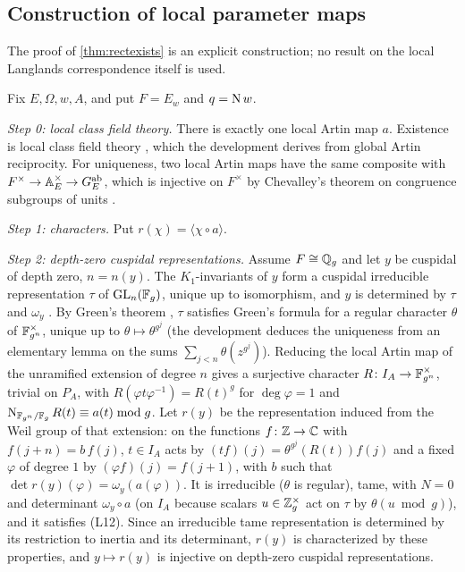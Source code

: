 \subsection{Construction of local parameter maps}\label{sec:galois:llcproof}

The proof of \cref{thm:rectexists} is an explicit construction; no result on the local Langlands
correspondence itself is used.

\begin{proofoutline}
Fix $E,\Omega,w,A$, and put $F=E_w$ and $q=\operatorname{N} w$.

\emph{Step 0: local class field theory.} There is exactly one local Artin map $a$. Existence is local
class field theory \cite{Serre1967,ArtinTate1968,Tate1979}, which the development derives from global
Artin reciprocity. For uniqueness, two local Artin maps have the same composite with
$F^\times\to\mathbb{A}_E^\times\to G_E^{\mathrm{ab}}$, which is injective on $F^\times$ by Chevalley's theorem on
congruence subgroups of units \cite{Chevalley1951}.

\emph{Step 1: characters.} Put $r(\chi)=\langle\chi\circ a\rangle$.

\emph{Step 2: depth-zero cuspidal representations.} Assume $F\cong\mathbb{Q}_g$ and let $y$ be cuspidal of
depth zero, $n=n(y)$. The $K_1$-invariants of $y$ form a cuspidal irreducible representation $\tau$ of
$\operatorname{GL}_n(\mathbb{F}_g)$, unique up to isomorphism, and $y$ is determined by $\tau$ and $\omega_y$
\cite{MoyPrasad1996,BushnellKutzko1993}. By Green's theorem \cite{Green1955}, $\tau$ satisfies Green's
formula for a regular character $\theta$ of $\mathbb{F}_{g^n}^\times$, unique up to $\theta\mapsto\theta^{g^j}$
(the development deduces the uniqueness from an elementary lemma on the sums
$\sum_{j<n}\theta(z^{g^j})$). Reducing the local Artin map of the unramified extension of degree $n$
gives a surjective character $R\colon I_A\to\mathbb{F}_{g^n}^\times$, trivial on $P_A$, with
$R(\varphi t\varphi^{-1})=R(t)^g$ for $\deg\varphi=1$ and $\operatorname{N}_{\mathbb{F}_{g^n}/\mathbb{F}_g}R(t)\equiv a(t)\bmod g$. Let
$r(y)$ be the representation induced from the Weil group of that extension: on the functions
$f\colon\mathbb{Z}\to\mathbb{C}$ with $f(j+n)=b\,f(j)$, $t\in I_A$ acts by $(tf)(j)=\theta^{g^j}(R(t))f(j)$ and a fixed
$\varphi$ of degree $1$ by $(\varphi f)(j)=f(j+1)$, with $b$ such that $\det r(y)(\varphi)=\omega_y(a(\varphi))$.
It is irreducible ($\theta$ is regular), tame, with $N=0$ and
determinant $\omega_y\circ a$ (on $I_A$ because scalars $u\in\mathbb{Z}_g^\times$ act on $\tau$ by
$\theta(u\bmod g)$), and it satisfies (L12). Since an irreducible tame representation is determined by
its restriction to inertia and its determinant, $r(y)$ is characterized by these properties, and
$y\mapsto r(y)$ is injective on depth-zero cuspidal representations.


\end{proofoutline}
